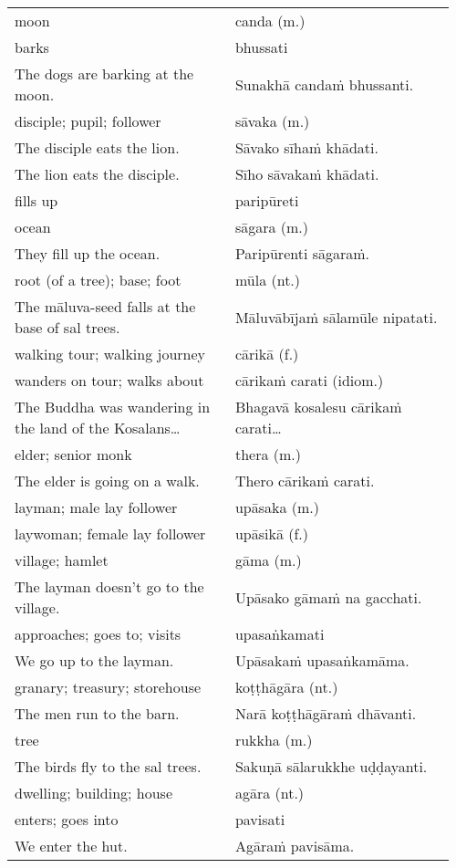 \documentclass[a5paper]{memoir}
\begin{document}
\begin{longtable}{L{0.48\linewidth} L{0.48\linewidth}}
moon & canda (m.)\\[0pt]
barks & bhussati\\[0pt]
The dogs are barking at the moon. & Sunakhā candaṁ bhussanti.\\[0pt]
disciple; pupil; follower & sāvaka (m.)\\[0pt]
The disciple eats the lion. & Sāvako sīhaṁ khādati.\\[0pt]
The lion eats the disciple. & Sīho sāvakaṁ khādati.\\[0pt]
fills up & paripūreti\\[0pt]
ocean & sāgara (m.)\\[0pt]
They fill up the ocean. & Paripūrenti sāgaraṁ.\\[0pt]
root (of a tree); base; foot & mūla (nt.)\\[0pt]
The māluva-seed falls at the base of sal trees. & Māluvābījaṁ sālamūle nipatati.\\[0pt]
walking tour; walking journey & cārikā (f.)\\[0pt]
wanders on tour; walks about & cārikaṁ carati (idiom.)\\[0pt]
The Buddha was wandering in the land of the Kosalans\ldots{} & Bhagavā kosalesu cārikaṁ carati\ldots{}\\[0pt]
elder; senior monk & thera (m.)\\[0pt]
The elder is going on a walk. & Thero cārikaṁ carati.\\[0pt]
layman; male lay follower & upāsaka (m.)\\[0pt]
laywoman; female lay follower & upāsikā (f.)\\[0pt]
village; hamlet & gāma (m.)\\[0pt]
The layman doesn't go to the village. & Upāsako gāmaṁ na gacchati.\\[0pt]
approaches; goes to; visits & upasaṅkamati\\[0pt]
We go up to the layman. & Upāsakaṁ upasaṅkamāma.\\[0pt]
granary; treasury; storehouse & koṭṭhāgāra (nt.)\\[0pt]
The men run to the barn. & Narā koṭṭhāgāraṁ dhāvanti.\\[0pt]
tree & rukkha (m.)\\[0pt]
The birds fly to the sal trees. & Sakuṇā sālarukkhe uḍḍayanti.\\[0pt]
dwelling; building; house & agāra (nt.)\\[0pt]
enters; goes into & pavisati\\[0pt]
We enter the hut. & Agāraṁ pavisāma.\\[0pt]

\end{longtable}
\end{document}
